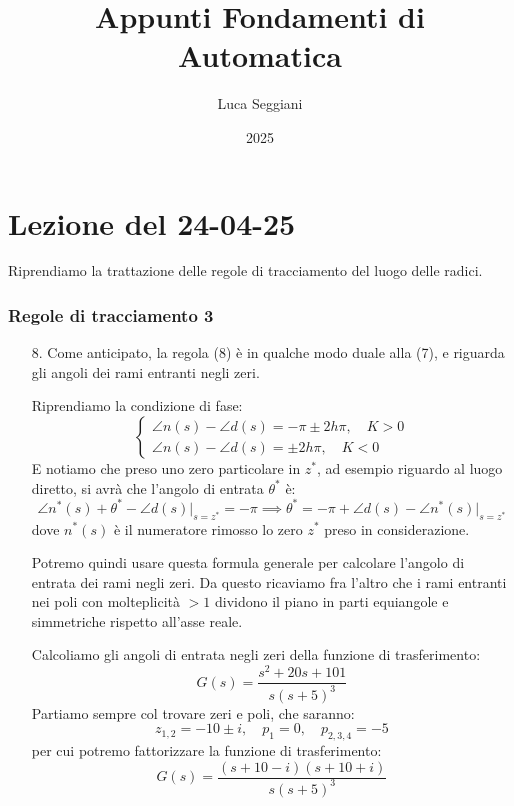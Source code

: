 \documentclass[a4paper,11pt]{article}
\title{Appunti Fondamenti di Automatica}
\author{Luca Seggiani}
\date{2025}
\begin{document}
\section{Lezione del 24-04-25}

\thispagestyle{empty}
\pagestyle{fancy}

Riprendiamo la trattazione delle regole di tracciamento del luogo delle radici.

\subsubsection{Regole di tracciamento 3}
\begin{enumerate}
	\item[8.] Come anticipato, la regola (8) è in qualche modo duale alla (7), e riguarda gli angoli dei rami entranti negli zeri.

		Riprendiamo la condizione di fase:
		\[
			\begin{cases}
				\angle n(s) - \angle d(s) = -\pi \pm 2 h \pi, \quad K > 0 \\
				\angle n(s) - \angle d(s) = \pm 2 h \pi, \quad K < 0
			\end{cases}
		\]
		E notiamo che preso uno zero particolare in $z^*$, ad esempio riguardo al luogo diretto, si avrà che l'angolo di entrata $\theta^*$ è:
		$$
		\angle n^*(s) + \theta^* - \angle d(s) \Big|_{s = z^*} = -\pi \implies \theta^* = -\pi + \angle d(s) - \angle n^*(s) \Big|_{s = z^*}
		$$
		dove $n^*(s)$ è il numeratore rimosso lo zero $z^*$ preso in considerazione.

		Potremo quindi usare questa formula generale per calcolare l'angolo di entrata dei rami negli zeri.
		Da questo ricaviamo fra l'altro che i rami entranti nei poli con molteplicità $> 1$ dividono il piano in parti equiangole e simmetriche rispetto all'asse reale.

		\par\medskip
		\noindent
		\textbf{}
		
		Calcoliamo gli angoli di entrata negli zeri della funzione di trasferimento:
		$$
		G(s) = \frac{s^2 + 20s + 101}{s (s + 5)^3}
		$$
		Partiamo sempre col trovare zeri e poli, che saranno:
		$$
		z_{1, 2} = -10 \pm i, \quad p_1 = 0, \quad p_{2, 3, 4} = -5
		$$
		per cui potremo fattorizzare la funzione di trasferimento:
		$$
		G(s) = \frac{ (s + 10 - i)(s + 10 + i) }{ s (s + 5)^3 }
		$$


\end{enumerate}
\end{document}
